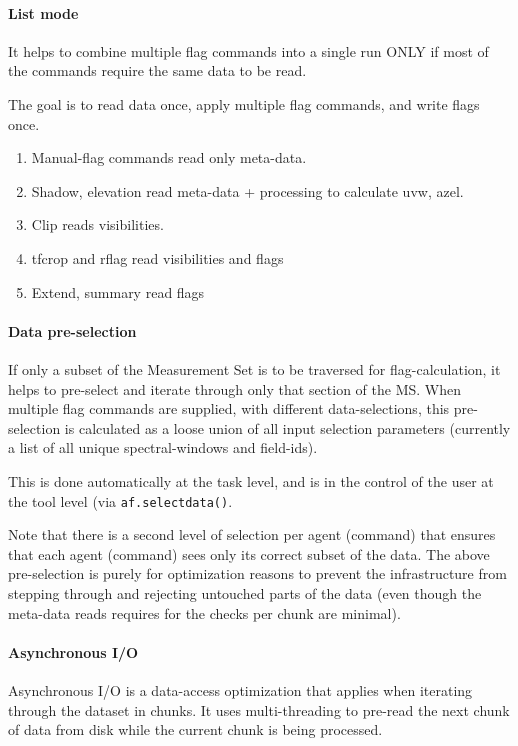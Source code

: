 \paragraph{List mode}

It helps to combine multiple flag commands into a single run ONLY if most of the
commands require the same data to be read.  

The goal is to read data once, apply multiple flag commands, and write flags once.

\begin{enumerate}
\item  Manual-flag commands read only meta-data.
\item  Shadow, elevation read meta-data + processing to calculate uvw, azel.
\item  Clip reads visibilities.
\item  tfcrop and rflag read visibilities and flags
\item Extend, summary read flags
\end{enumerate}



\paragraph{Data pre-selection}
If only a subset of the Measurement Set is to be traversed for flag-calculation,
it helps to pre-select and iterate through only that section of the MS.  
When multiple flag commands are supplied, with different data-selections, 
this pre-selection is calculated as a loose union of all input selection parameters
(currently a list of all unique spectral-windows and field-ids).

This is done automatically at the task level, and is in the control of the user at the 
tool level (via {\tt af.selectdata()}.

Note that there is a second level of selection per agent (command) that ensures
that each agent (command) sees only its correct subset of the data. 
The above pre-selection is purely for optimization reasons to prevent the infrastructure
from stepping through and rejecting untouched parts of the data (even though the
meta-data reads requires for the checks per chunk are minimal). 

\paragraph{Asynchronous I/O}
Asynchronous I/O is a data-access optimization that applies when iterating through the
dataset in chunks.  It uses multi-threading to pre-read the next chunk of data from disk
while the current chunk is being processed.


